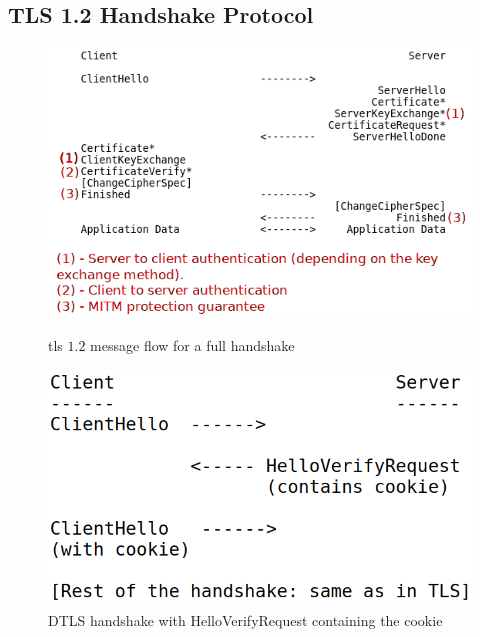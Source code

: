\documentclass{llncs}
\begin{document}
\subsection{TLS 1.2 Handshake Protocol} \label{hsp}

\begin{figure}
    \centering
    \begin{minipage}{0.6\textwidth}
        \centering
        \includegraphics[width=1.0\textwidth]{img/tls-12-full-handshake2.png} %
        \caption{\label{fig:tls-12-handshake} \gls{tls} $1.2$ message flow for a full handshake}
    \end{minipage}\hfill
    \begin{minipage}{0.4\textwidth}
        \centering
        \includegraphics[width=1.0\textwidth]{img/dtls-cookie.png} %
        \caption{\label{fig:dtls-cookie} DTLS handshake with HelloVerifyRequest containing the cookie}
    \end{minipage}
\end{figure}
\end{document}
